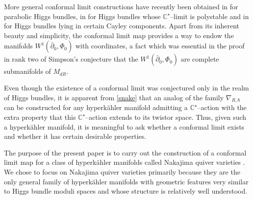 \documentclass[12pt,oneside,reqno]{amsart}
\theoremstyle{definition}
\numberwithin{equation}{section}
\numberwithin{theorem}{section}
\newcommand{\C}{\mathbb{C}}
\newcommand{\pa}{\partial}
\begin{document}
More general conformal limit constructions have recently been obtained in \cite{CFW} for parabolic Higgs bundles, in \cite{KW} for Higgs bundles whose $\C^{\star}$--limit is polystable and in \cite{KM} for Higgs bundles lying in certain Cayley components. Apart from its inherent beauty and simplicity, the conformal limit map provides a way to endow the manifolds $W^1(\bar\pa_0,\Phi_0)$ with coordinates, a fact which was essential in the proof in rank two \cite{DS} of Simpson's conjecture \cite{Simpson} that the $W^1(\bar\pa_0,\Phi_0)$ are complete submanifolds of $M_{dR}$. 

Even though the existence of a conformal limit was conjectured only in the realm of Higgs bundles, it is apparent from \eqref{snake} that an analog of the family $\nabla_{R,\hbar}$ can be constructed for any hyperk\"ahler manifold admitting a $\C^{\star}$--action with the extra property that this $\C^{\star}$--action extends to its twistor space. Thus, given such a hyperk\"ahler manifold, it is meaningful to ask whether a conformal limit exists and whether it has certain desirable properties. 

The purpose of the present paper is to carry out the construction of a conformal limit map for a class of hyperk\"ahler manifolds called Nakajima quiver varieties \cite{Na1994}. We chose to focus on Nakajima quiver varieties primarily because they are the only general family of hyperk\"ahler manifolds with geometric features very similar to Higgs bundle moduli spaces and whose structure is relatively well understood. 
\end{document}

